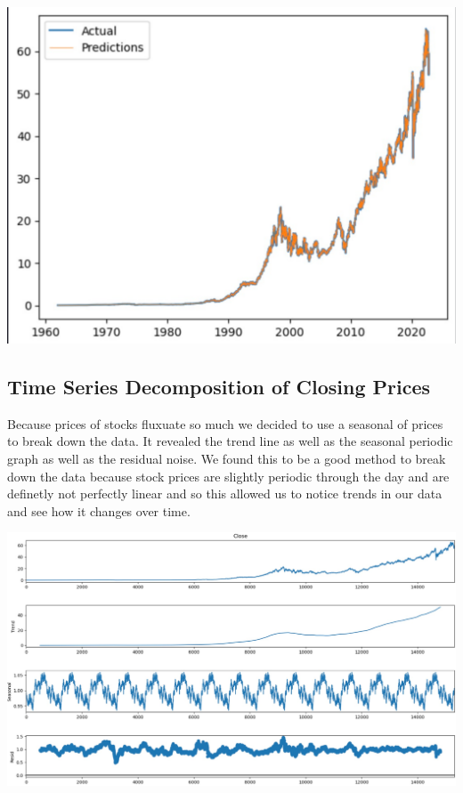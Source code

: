 \documentclass[11pt]{article}
\begin{document}
\includegraphics[width=\textwidth]{../images/random_forest_regressor.pdf}


\subsection{Time Series Decomposition of Closing Prices}

Because prices of stocks fluxuate so much we decided to use a seasonal of prices to break down the data. It 
revealed the trend line as well as the seasonal periodic graph as well as the residual noise. We found this to 
be a good method to break down the data because stock prices are slightly periodic through the day and are definetly 
not perfectly linear and so this allowed us to notice trends in our data and see how it changes over time.

\includegraphics[width=\textwidth]{../images/decomposition.pdf}
\end{document}
